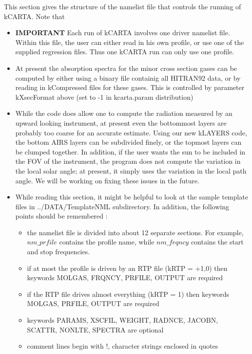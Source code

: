 \documentclass[12pt]{article}
\newcommand{\kc}{\textsf{kCARTA}\xspace}
\begin{document}
This section gives the structure of the namelist file that controls the 
running of \kc.  Note that 
\begin{itemize}
\item {\bf IMPORTANT} Each run of \kc involves one driver namelist file.
  Within this file, the user can either read in his own profile, or
  use one of the supplied regression files.  Thus one \kc run can only
  use one profile.
\item At present the absorption spectra for the minor cross section gases can
  be computed by either using a binary file containig all HITRAN92 data, or by
  reading in kCompressed files for these gases. This is controlled by
  parameter kXsecFormat above (set to -1 in kcarta.param distribution)
\item While the code does allow one to compute the radiation measured
  by an upward looking instrument, at present even the bottommost
  layers are probably too coarse for an accurate estimate. Using our new 
  kLAYERS code, the bottom AIRS layers can be subdivided finely, or the 
  topmost layers can be clumped together. In
  addition, if the user wants the sun to be included in the FOV of the
  instrument, the program does not compute the variation in the local
  solar angle; at present, it simply uses the variation in the local
  path angle.  We will be working on fixing these issues in the future.
\item While reading this section, it might be helpful to look at the
  sample template files in {\sf ../DATA/TemplateNML} subdirectory.  In
  addition, the following points should be remembered :
   \begin{itemize}
   \item the namelist file is divided into about 12 separate sections. For
      example, $nm\_prfile$ contains the profile name, while 
      $nm\_frqncy$ contains the start and stop frequencies.
   \item if at most the profile is driven by an RTP file (kRTP = +1,0) then 
         keywords MOLGAS, FRQNCY, PRFILE, OUTPUT are required  
   \item if the RTP file drives almost everything (kRTP = 1) then 
         keywords MOLGAS, PRFILE, OUTPUT are required  
  \item keywords PARAMS, XSCFIL, WEIGHT, RADNCE, JACOBN, SCATTR, NONLTE, 
        SPECTRA are optional 
   \item comment lines begin with !, character strings enclosed in quotes
   \end{itemize}

\end{itemize}
\end{document}
